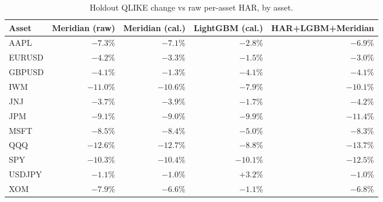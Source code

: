 \begin{table}[!htbp]
\centering
\small
\caption{Holdout QLIKE change vs raw per-asset HAR, by asset.}
\label{tab:volasset}
\begin{tabularx}{\linewidth}{Xrrrr}
\toprule
\textbf{Asset} & \textbf{Meridian (raw)} & \textbf{Meridian (cal.)} & \textbf{LightGBM (cal.)} & \textbf{HAR+LGBM+Meridian} \\
\midrule
AAPL & $-7.3\%$ & $-7.1\%$ & $-2.8\%$ & $-6.9\%$ \\
EURUSD & $-4.2\%$ & $-3.3\%$ & $-1.5\%$ & $-3.0\%$ \\
GBPUSD & $-4.1\%$ & $-1.3\%$ & $-4.1\%$ & $-4.1\%$ \\
IWM & $-11.0\%$ & $-10.6\%$ & $-7.9\%$ & $-10.1\%$ \\
JNJ & $-3.7\%$ & $-3.9\%$ & $-1.7\%$ & $-4.2\%$ \\
JPM & $-9.1\%$ & $-9.0\%$ & $-9.9\%$ & $-11.4\%$ \\
MSFT & $-8.5\%$ & $-8.4\%$ & $-5.0\%$ & $-8.3\%$ \\
QQQ & $-12.6\%$ & $-12.7\%$ & $-8.8\%$ & $-13.7\%$ \\
SPY & $-10.3\%$ & $-10.4\%$ & $-10.1\%$ & $-12.5\%$ \\
USDJPY & $-1.1\%$ & $-1.0\%$ & $+3.2\%$ & $-1.0\%$ \\
XOM & $-7.9\%$ & $-6.6\%$ & $-1.1\%$ & $-6.8\%$ \\
\bottomrule
\end{tabularx}
\end{table}
